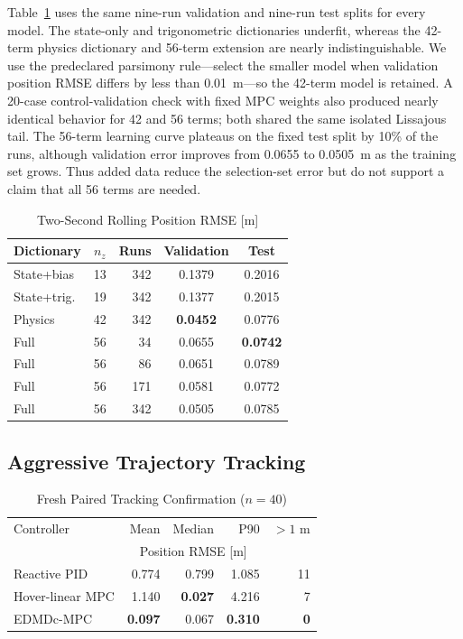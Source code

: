 \documentclass[letterpaper,10pt,conference]{ieeeconf}
\begin{document}
Table~\ref{tab:capacity} uses the same nine-run validation and nine-run test
splits for every model. The state-only and trigonometric dictionaries
underfit, whereas the 42-term physics dictionary and 56-term extension are
nearly indistinguishable. We use the predeclared parsimony rule---select the
smaller model when validation position RMSE differs by less than 0.01~m---so
the 42-term model is retained. A 20-case control-validation check with fixed
MPC weights also produced nearly identical behavior for 42 and 56 terms; both
shared the same isolated Lissajous tail. The 56-term learning curve plateaus
on the fixed test split by 10\% of the runs, although validation error improves
from 0.0655 to 0.0505~m as the training set grows. Thus added data reduce the
selection-set error but do not support a claim that all 56 terms are needed.

\begin{table}[t]
\centering
\caption{Two-Second Rolling Position RMSE [m]}
\label{tab:capacity}
\begin{tabular}{lrrcc}
\toprule
Dictionary & $n_z$ & Runs & Validation & Test\\
\midrule
State+bias & 13 & 342 & 0.1379 & 0.2016\\
State+trig. & 19 & 342 & 0.1377 & 0.2015\\
Physics & 42 & 342 & \textbf{0.0452} & 0.0776\\
Full & 56 & 34 & 0.0655 & \textbf{0.0742}\\
Full & 56 & 86 & 0.0651 & 0.0789\\
Full & 56 & 171 & 0.0581 & 0.0772\\
Full & 56 & 342 & 0.0505 & 0.0785\\
\bottomrule
\end{tabular}
\end{table}

\subsection{Aggressive Trajectory Tracking}

\begin{table}[t]
\centering
\caption{Fresh Paired Tracking Confirmation ($n=40$)}
\label{tab:tracking}
\begin{tabular}{lrrrr}
\toprule
Controller & Mean & Median & P90 & $>1$ m\\
& \multicolumn{3}{c}{Position RMSE [m]} & \\
\midrule
Reactive PID & 0.774 & 0.799 & 1.085 & 11\\
Hover-linear MPC & 1.140 & \textbf{0.027} & 4.216 & 7\\
EDMDc-MPC & \textbf{0.097} & 0.067 & \textbf{0.310} & \textbf{0}\\
\bottomrule
\end{tabular}
\end{table}
\end{document}
